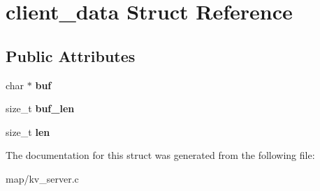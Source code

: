\hypertarget{structclient__data}{}\section{client\+\_\+data Struct Reference}
\label{structclient__data}
\subsection*{Public Attributes}
\begin{DoxyCompactItemize}
\item 
\mbox{\label{structclient__data_a11add7cdbb8e257ef6fe3aca3be4e157}} 
char $\ast$ {\bfseries buf}
\item 
\mbox{\label{structclient__data_a03747a1317ed2159a3f685f8f4688961}} 
size\+\_\+t {\bfseries buf\+\_\+len}
\item 
\mbox{\label{structclient__data_a5df0c8ac8973c66f5b436f7549eb6cb3}} 
size\+\_\+t {\bfseries len}
\end{DoxyCompactItemize}


The documentation for this struct was generated from the following file\+:\begin{DoxyCompactItemize}
\item 
map/kv\+\_\+server.\+c\end{DoxyCompactItemize}
